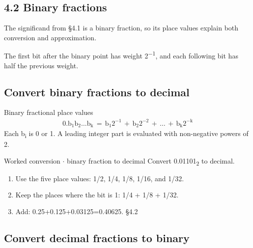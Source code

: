 \documentclass[11pt]{article}
\begin{document}
\begin{keepsection}
\section{4.2 Binary fractions}

The significand from §4.1 is a binary fraction, so its place values explain both conversion and approximation.

The first bit after the binary point has weight 2\textsuperscript{\ensuremath{-}1}, and each following bit has half the previous weight.

\begin{keepsection}
\subsection{Convert binary fractions to decimal}

\begin{equationcard}{Binary fractional place values}
\[ \begin{gathered} 0.\mathrm{b}_{1}\mathrm{b}_{2}…\mathrm{b}_{\mathrm{k}}\, =\, \mathrm{b}_{1}2^{-1}\, +\, \mathrm{b}_{2}2^{-2}\, +\, …\, +\, \mathrm{b}_{\mathrm{k}}2^{-\mathrm{k}} \end{gathered} \]
{\small Each b\textsubscript{i} is 0 or 1. A leading integer part is evaluated with non-negative powers of 2.}
\end{equationcard}

\begin{workedbox}{Worked conversion \ensuremath{\cdot} binary fraction to decimal}
Convert 0.01101\textsubscript{2} to decimal.

\begin{enumerate}
\item Use the five place values: 1/2, 1/4, 1/8, 1/16, and 1/32.
\item Keep the places where the bit is 1: 1/4 + 1/8 + 1/32.
\item Add: 0.25+0.125+0.03125=0.40625. \hfill{\small\color{FAUblue}§4.2}
\end{enumerate}
\end{workedbox}
\end{keepsection}

\begin{keepsection}
\subsection{Convert decimal fractions to binary}


\end{keepsection}
\end{keepsection}
\end{document}
